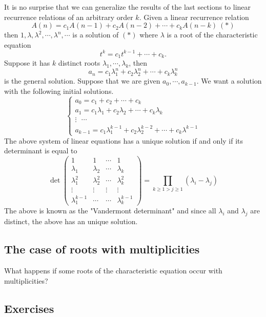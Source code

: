 It is no surprise that we can generalize the results of the last sections to linear recurrence relations of an arbitrary order $k$.
Given a linear recurrence relation
$$
A(n)=c_1A(n-1)+c_2A(n-2)+\cdots+c_kA(n-k)\ (*)
$$
then $1, \lambda, \lambda^2, \cdots, \lambda^n, \cdots$ is a solution of $(*)$ where $\lambda$ is a root of the characteristic equation
$$
t^k=c_1 t^{k-1} + \cdots + c_k.
$$
Suppose it has $k$ distinct roots $\lambda_1, \cdots, \lambda_k$, then 
$$
a_n=c_1 \lambda_1^n + c_2 \lambda_2^n + \cdots + c_k \lambda_k^n
$$
is the general solution. Suppose that we are given $a_0, \cdots, a_{k-1}$. We want a solution with the following initial solutions.
$$
\begin{cases}
    a_0 = c_1 + c_2 + \cdots + c_k\\    
    a_1 = c_1 \lambda_1 + c_2 \lambda_2 + \cdots + c_k \lambda_k\\
    \vdots \text{ } \cdots\\
    a_{k-1}= c_1 \lambda_1^{k-1} + c_2 \lambda_2^{k-2} + \cdots + c_k \lambda^{k-1}   
\end{cases}
$$
The above system of linear equations has a unique solution if and only if its determinant is equal to 
$$
\det\begin{pmatrix} 1 & 1 & \cdots & 1 
    \\ \lambda_1 & \lambda_2 & \cdots & \lambda_k \\
    \lambda_1^2 & \lambda_2^2 & \cdots & \lambda_k^2 \\
    \vdots & \vdots & \vdots & \vdots \\
    \lambda_1^{k-1} & \cdots & \cdots & \lambda_k^{k-1}  
\end{pmatrix} 
= \prod_{k \geq 1 > j \geq 1} (\lambda_i - \lambda_j)
$$
The above is known as the "Vandermont determinant" and since all $\lambda_i$ and $\lambda_j$ are distinct, the above has an unique solution.

\subsection{The case of roots with multiplicities}

What happens if some roots of the characteristic equation occur with multiplicities?

\subsection{Exercises}

